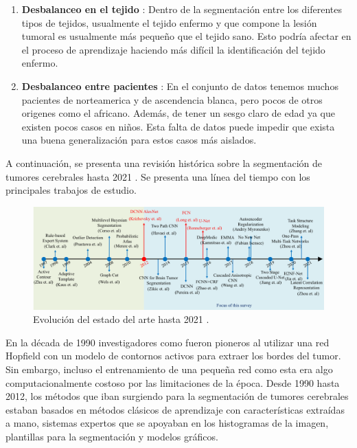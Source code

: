 \begin{enumerate}
	\item \textbf{Desbalanceo en el tejido} : Dentro de la segmentación entre los diferentes tipos de tejidos, usualmente el tejido enfermo y que compone la lesión tumoral es usualmente más pequeño que el tejido sano. Esto podría afectar en el proceso de aprendizaje haciendo más difícil la identificación del tejido enfermo. 
	
	\item \textbf{Desbalanceo entre pacientes} : En el conjunto de datos tenemos muchos pacientes de norteamerica y de ascendencia blanca, pero pocos de otros origenes como el africano. Además, de tener un sesgo claro de edad ya que existen pocos casos en niños. Esta falta de datos puede impedir que exista una buena generalización para estos casos más aislados.
	
\end{enumerate}


	A continuación, se presenta una revisión histórica sobre la segmentación de tumores cerebrales hasta 2021 \cite{liu2023deep}. Se presenta una línea del tiempo con los principales trabajos de estudio.
	
	\begin{figure}[H]
		\centering
		\includegraphics[width=1.0\linewidth]{imagenes/evolution_stateofart.png}
		\caption{Evolución del estado del arte hasta 2021 \cite{liu2023deep}.}
	\end{figure}
	
	En la década de 1990 investigadores como \cite{zhu1997computerized} fueron pioneros al utilizar una red Hopfield con un modelo de contornos activos para extraer los bordes del tumor. Sin embargo, incluso el entrenamiento de una pequeña red como esta era algo computacionalmente costoso por las limitaciones de la época.  Desde 1990 hasta 2012, los métodos que iban surgiendo para la segmentación de tumores cerebrales estaban basados en métodos clásicos de aprendizaje con características extraídas a mano, sistemas expertos que se apoyaban en los histogramas de la imagen, plantillas para la segmentación y modelos gráficos. 
	
